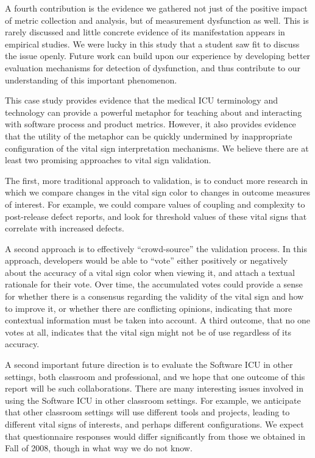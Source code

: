 \documentclass[times,10pt,twocolumn]{article}
\begin{document}
A fourth contribution is the evidence we gathered not just of the positive
impact of metric collection and analysis, but of measurement dysfunction as
well.  This is rarely discussed and little concrete evidence of its
manifestation appears in empirical studies.  We were lucky in this study
that a student saw fit to discuss the issue openly.  Future work can build
upon our experience by developing better evaluation mechanisms for
detection of dysfunction, and thus contribute to our understanding of this
important phenomenon.


This case study provides evidence that the medical ICU terminology and
technology can provide a powerful metaphor for teaching about and
interacting with software process and product metrics.  However, it also
provides evidence that the utility of the metaphor can be quickly
undermined by inappropriate configuration of the vital sign interpretation
mechanisms.  We believe there are at least two promising approaches to
vital sign validation.

The first, more traditional approach to validation, is to conduct more
research in which we compare changes in the vital sign color to changes in
outcome measures of interest.  For example, we could compare values of
coupling and complexity to post-release defect reports, and look for
threshold values of these vital signs that correlate with increased
defects.

A second approach is to effectively ``crowd-source'' the validation
process.  In this approach, developers would be able to ``vote'' either
positively or negatively about the accuracy of a vital sign color when
viewing it, and attach a textual rationale for their vote.  Over time, the
accumulated votes could provide a sense for whether there is a consensus
regarding the validity of the vital sign and how to improve it, or whether
there are conflicting opinions, indicating that more contextual information
must be taken into account.  A third outcome, that no one votes at all,
indicates that the vital sign might not be of use regardless of its
accuracy.

A second important future direction is to evaluate the Software ICU in other
settings, both classroom and professional, and we hope that one outcome of
this report will be such collaborations.  There are many interesting issues
involved in using the Software ICU in other classroom settings. For
example, we anticipate that other classroom settings will use different
tools and projects, leading to different vital signs of interests, and
perhaps different configurations.  We expect that questionnaire
responses would differ significantly from those we obtained in Fall of
2008, though in what way we do not know.
\end{document}
